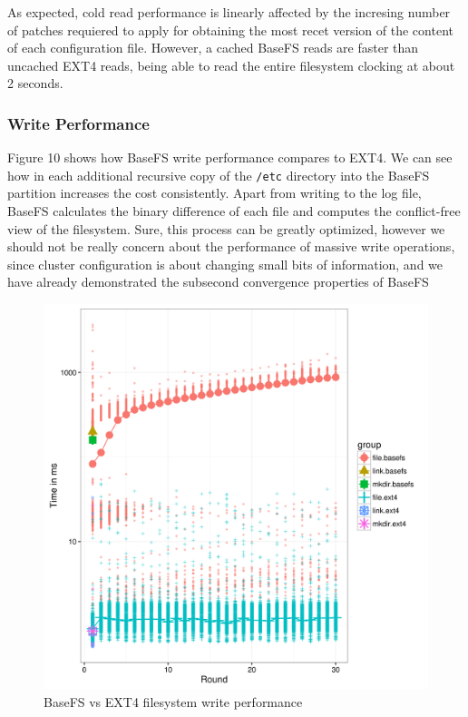 \documentclass{sig-alternate}
\begin{document}
As expected, cold read performance is linearly affected by the incresing number of patches requiered to apply for obtaining the most recet version of the content of each configuration file. However, a cached BaseFS reads are faster than uncached EXT4 reads, being able to read the entire filesystem clocking at about 2 seconds.

\subsubsection{Write Performance}


Figure 10 shows how BaseFS write performance compares to EXT4. We can see how in each additional recursive copy of the \texttt{/etc} directory into the BaseFS partition increases the cost consistently. Apart from writing to the log file, BaseFS calculates the binary difference of each file and computes the conflict-free view of the filesystem. Sure, this process can be greatly optimized, however we should not be really concern about the performance of massive write operations, since cluster configuration is about changing small bits of information, and we have already demonstrated the subsecond convergence properties of BaseFS


\begin{figure}[htp]
\centering
\includegraphics[width=\columnwidth]{../eval/plots/write_performance.png}
\caption{BaseFS vs EXT4 filesystem write performance}
\label{fig:write-performance}
\end{figure}
\end{document}
